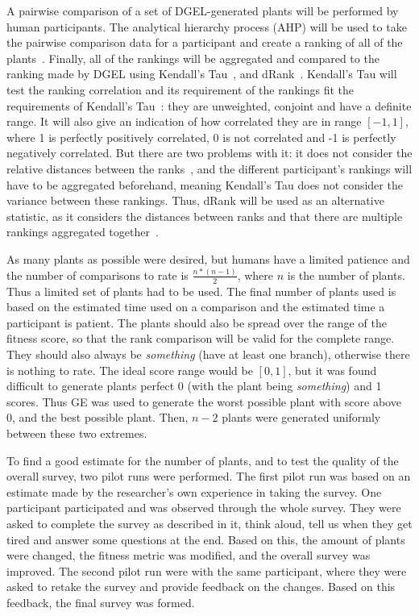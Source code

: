 A pairwise comparison of a set of DGEL-generated plants will be performed by human participants.
The analytical hierarchy process (AHP) will be used to take the pairwise comparison data for a participant and create a ranking of all of the plants~\cite{2008Saaty}.
Finally, all of the rankings will be aggregated and compared to the ranking made by DGEL using Kendall's Tau~\cite{1938Kendall}, and dRank~\cite{2009Carterette}.
Kendall's Tau will test the ranking correlation and its requirement of the rankings fit the requirements of Kendall's Tau~\cite{2010Webber}: they are unweighted, conjoint and have a definite range.
It will also give an indication of how correlated they are in range $[-1, 1]$, where 1 is perfectly positively correlated, 0 is not correlated and -1 is perfectly negatively correlated.
But there are two problems with it: it does not consider the relative distances between the ranks~\cite{2010Webber}, and the different participant's rankings will have to be aggregated beforehand, meaning Kendall's Tau does not consider the variance between these rankings.
Thus, dRank will be used as an alternative statistic, as it considers the distances between ranks and that there are multiple rankings aggregated together~\cite{2010Webber,2009Carterette}.

As many plants as possible were desired, but humans have a limited patience and the number of comparisons to rate is $\frac{n * (n - 1)}{2}$, where $n$ is the number of plants.
Thus a limited set of plants had to be used.
The final number of plants used is based on the estimated time used on a comparison and the estimated time a participant is patient.
The plants should also be spread over the range of the fitness score, so that the rank comparison will be valid for the complete range.
They should also always be \textit{something} (have at least one branch), otherwise there is nothing to rate.
The ideal score range would be $[0, 1]$, but it was found difficult to generate plants perfect 0 (with the plant being \textit{something}) and 1 scores.
Thus GE was used to generate the worst possible plant with score above 0, and the best possible plant.
Then, $n - 2$ plants were generated uniformly between these two extremes.


To find a good estimate for the number of plants, and to test the quality of the overall survey, two pilot runs were performed.
The first pilot run was based on an estimate made by the researcher's own experience in taking the survey.
One participant participated and was observed through the whole survey.
They were asked to complete the survey as described in it, think aloud, tell us when they get tired and answer some questions at the end.
Based on this, the amount of plants were changed, the fitness metric was modified, and the overall survey was improved.
The second pilot run were with the same participant, where they were asked to retake the survey and provide feedback on the changes.
Based on this feedback, the final survey was formed.

